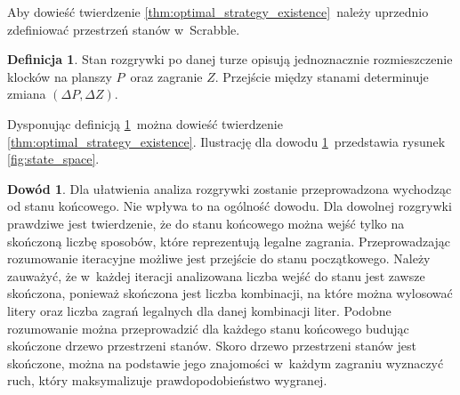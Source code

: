 \documentclass[a4paper,twocolumn,12pt]{article}
\theoremstyle{definition}
\newtheorem{definition}{Definicja}
\newtheorem{pro}{Dowód}
\begin{document}
Aby dowieść twierdzenie \ref{thm:optimal_strategy_existence}~należy uprzednio zdefiniować przestrzeń stanów w~Scrabble.

\begin{definition}
	Stan rozgrywki po danej turze opisują jednoznacznie rozmieszczenie klocków na planszy $P$~oraz zagranie $Z$. Przejście między stanami determinuje zmiana $(\Delta P, \Delta Z)$.
	\label{def:scrabble_state_space}
\end{definition}

Dysponując definicją \ref{def:scrabble_state_space}~można dowieść twierdzenie \ref{thm:optimal_strategy_existence}. Ilustrację dla dowodu \ref{pro:optimal_strategy_existence}~przedstawia rysunek \ref{fig:state_space}.

\begin{pro}
	Dla ułatwienia analiza rozgrywki zostanie przeprowadzona wychodząc od stanu końcowego. Nie wpływa to na ogólność dowodu. Dla dowolnej rozgrywki prawdziwe jest twierdzenie, że do stanu końcowego można wejść tylko na skończoną liczbę sposobów, które reprezentują legalne zagrania. Przeprowadzając rozumowanie iteracyjne możliwe jest przejście do stanu początkowego. Należy zauważyć, że w~każdej iteracji analizowana liczba wejść do stanu jest zawsze skończona, ponieważ skończona jest liczba kombinacji, na które można wylosować litery oraz liczba zagrań legalnych dla danej kombinacji liter. Podobne rozumowanie można przeprowadzić dla każdego stanu końcowego budując skończone drzewo przestrzeni stanów. Skoro drzewo przestrzeni stanów jest skończone, można na podstawie jego znajomości w~każdym zagraniu wyznaczyć ruch, który maksymalizuje prawdopodobieństwo wygranej.
	\label{pro:optimal_strategy_existence}
\end{pro}
\end{document}
